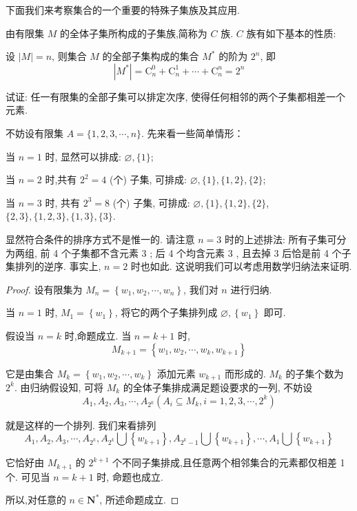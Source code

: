 下面我们来考察集合的一个重要的特殊子集族及其应用.

由有限集 $M$ 的全体子集所构成的子集族,简称为 $C$ 族. $C$ 族有如下基本的性质:

\begin{property}
	设 $|M|=n$, 则集合 $M$ 的全部子集构成的集合 $M^{*}$ 的阶为 $2^{n}$, 即
	$$
		\left|M^{*}\right|=\mathrm{C}_{n}^{0}+\mathrm{C}_{n}^{1}+\cdots+\mathrm{C}_{n}^{n}=2^{n}
	$$
\end{property}

\begin{example}\label{ex:任一有限集的全部子集}
	试证: 任一有限集的全部子集可以排定次序, 使得任何相邻的两个子集都相差一个元素.
\end{example}

\begin{analysis}
	不妨设有限集 $A=\{1,2,3, \cdots, n\}$. 先来看一些简单情形：

	当 $n=1$ 时, 显然可以排成: $\varnothing,\{1\} ;$

	当 $n=2$ 时,共有 $2^{2}=4$ (个) 子集, 可排成: $\varnothing,\{1\},\{1,2\},\{2\}$;

	当 $n=3$ 时, 共有 $2^{3}=8$ (个) 子集, 可排成: $\varnothing,\{1\},\{1,2\},\{2\}$, $\{2,3\},\{1,2,3\},\{1,3\},\{3\}$.

	显然符合条件的排序方式不是惟一的. 请注意 $n=3$ 时的上述排法: 所有子集可分为两组, 前 4 个子集都不含元素 3 ; 后 4 个均含元素 3 , 且去掉 3 后恰是前 4 个子集排列的逆序. 事实上, $n=2$ 时也如此. 这说明我们可以考虑用数学归纳法来证明.
\end{analysis}

\begin{proof}
	设有限集为 $M_{n}=\left\{w_{1}, w_{2}, \cdots, w_{n}\right\}$, 我们对 $n$ 进行归纳.

	当 $n=1$ 时, $M_{1}=\left\{w_{1}\right\}$, 将它的两个子集排列成 $\varnothing,\left\{w_{1}\right\}$ 即可.

	假设当 $n=k$ 时,命题成立. 当 $n=k+1$ 时,
	$$
		M_{k+1}=\left\{w_{1}, w_{2}, \cdots, w_{k}, w_{k+1}\right\}
	$$

	它是由集合 $M_{k}=\left\{w_{1}, w_{2}, \cdots, w_{k}\right\}$ 添加元素 $w_{k+1}$ 而形成的. $M_{k}$ 的子集个数为\\
	$2^{k}$. 由归纳假设知, 可将 $M_{k}$ 的全体子集排成满足题设要求的一列, 不妨设
	$$
		A_{1}, A_{2}, A_{3}, \cdots, A_{2^{k}}\left(A_{i} \subseteq M_{k}, i=1,2,3, \cdots, 2^{k}\right)
	$$

	就是这样的一个排列. 我们来看排列
	$$
		A_{1}, A_{2}, A_{3}, \cdots, A_{2^{k}}, A_{2^{k}} \bigcup\left\{w_{k+1}\right\}, A_{2^{k}-1} \bigcup\left\{w_{k+1}\right\}, \cdots, A_{1} \bigcup\left\{w_{k+1}\right\}
	$$

	它恰好由 $M_{k+1}$ 的 $2^{k+1}$ 个不同子集排成,且任意两个相邻集合的元素都仅相差 1 个. 可见当 $n=k+1$ 时, 命题也成立.

	所以,对任意的 $n \in \mathbf{N}^{*}$, 所述命题成立.
\end{proof}

